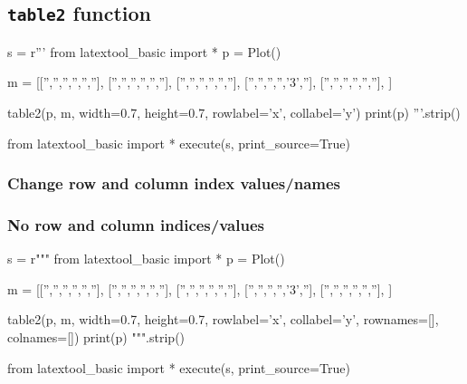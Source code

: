 \subsection{\texttt{table2} function}


\begin{python}
s = r'''
from latextool_basic import *
p = Plot()

m = [['','','','','',''],
     ['','','','','',''],
     ['','','','','',''],
     ['','','','','3',''],
     ['','','','','',''],
     ]

table2(p, m, width=0.7, height=0.7, rowlabel='x', collabel='y')
print(p)
'''.strip()

from latextool_basic import *
execute(s, print_source=True)
\end{python}


\newpage
\subsubsection{Change row and column index values/names}



\newpage
\subsubsection{No row and column indices/values}

\begin{python}
s = r"""
from latextool_basic import *
p = Plot()

m = [['','','','','',''],
     ['','','','','',''],
     ['','','','','',''],
     ['','','','','3',''],
     ['','','','','',''],
     ]

table2(p, m, width=0.7, height=0.7, rowlabel='x', collabel='y',
       rownames=[],
       colnames=[])
print(p)
""".strip()

from latextool_basic import *
execute(s, print_source=True)
\end{python}


